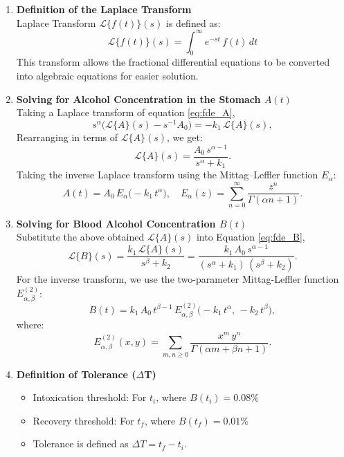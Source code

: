 \documentclass[11pt]{article}
\begin{document}
\begin{enumerate}
  \item \textbf{Definition of the Laplace Transform}\\
    Laplace Transform \(\mathcal{L}\{f(t)\}(s)\) is defined as:
    \[
      \mathcal{L}\{f(t)\}(s)
      = \int_{0}^{\infty} e^{-s t}\,f(t)\,dt
    \]
    This transform allows the fractional differential equations to be converted into algebraic equations for easier solution.
    
  \item \textbf{Solving for Alcohol Concentration in the Stomach \(A(t)\)}\\
    Taking a Laplace transform of equation \eqref{eq:fde_A},
    \[
      s^\alpha\bigl(\mathcal{L}\{A\}(s)-s^{-1}A_0\bigr)
      = -k_1\,\mathcal{L}\{A\}(s),
    \]
    Rearranging in terms of \(\mathcal{L}\{A\}(s)\), we get:
    \[
      \mathcal{L}\{A\}(s)
      = \frac{A_0\,s^{\alpha-1}}{s^\alpha + k_1}.
    \]
    Taking the inverse Laplace transform using the Mittag–Leffler function \(E_{\alpha}\):
    \begin{equation}
      A(t)
      = A_0\,E_{\alpha}\bigl(-k_1\,t^\alpha\bigr),
      \quad
      E_{\alpha}(z)
      = \sum_{n=0}^{\infty}\frac{z^n}{\Gamma(\alpha n + 1)}.
      \label{eq:sol_A}
    \end{equation}

  \item \textbf{Solving for Blood Alcohol Concentration \(B(t)\)}\\
    Substitute the above obtained \(\mathcal{L}\{A\}(s)\) into Equation \eqref{eq:fde_B},
    \begin{equation}
      \mathcal{L}\{B\}(s)
      = \frac{k_1\,\mathcal{L}\{A\}(s)}{s^\beta + k_2}
      = \frac{k_1\,A_0\,s^{\alpha-1}}
             {(s^\alpha + k_1)\,(s^\beta + k_2)}.
             \label{eq:sol_B}
    \end{equation}
    For the inverse transform, we use the two-parameter Mittag-Leffler function
    \(E_{\alpha,\beta}^{(2)}\):
    \[
      B(t)
      = k_1\,A_0\,
        t^{\beta-1}\,
        E_{\alpha,\beta}^{(2)}\bigl(-k_1\,t^\alpha,\,-k_2\,t^\beta\bigr),
    \]
    where:
    \[
      E_{\alpha,\beta}^{(2)}(x,y)
      = \sum_{m,n\ge0}
        \frac{x^m\,y^n}{\Gamma(\alpha m + \beta n + 1)}.
    \]

  \item \textbf{Definition of Tolerance ($\Delta$T)}\\
    \begin{itemize}
      \item Intoxication threshold: For \(t_i\), where \(B(t_i)=0.08\%\) %
      \item Recovery threshold: For \(t_f\), where \(B(t_f)=0.01\%\) %
      \item Tolerance is defined as \(\Delta T = t_f - t_i\).
    \end{itemize}
\end{enumerate}
\end{document}
